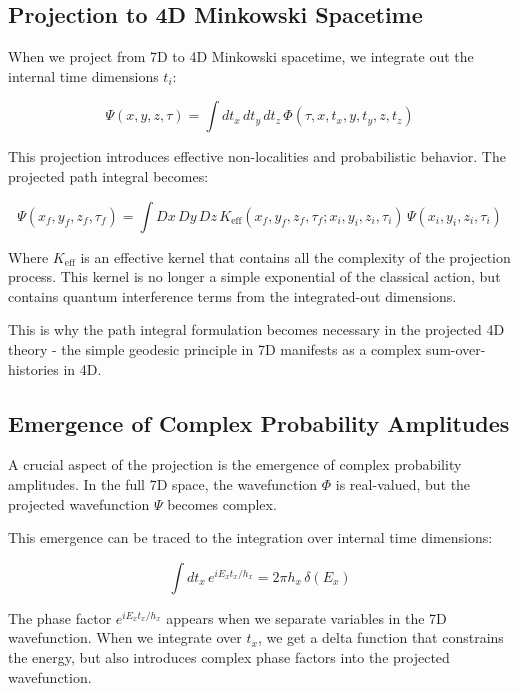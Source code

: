 \documentclass{article}
\begin{document}
\subsection{Projection to 4D Minkowski Spacetime}

When we project from 7D to 4D Minkowski spacetime, we integrate out the internal time dimensions $t_i$:

\begin{equation}
\Psi(x,y,z,\tau) = \int dt_x \, dt_y \, dt_z \, \Phi(\tau, x, t_x, y, t_y, z, t_z)
\end{equation}

This projection introduces effective non-localities and probabilistic behavior. The projected path integral becomes:

\begin{equation}
\Psi(x_f,y_f,z_f,\tau_f) = \int Dx \, Dy \, Dz \, K_{\text{eff}}(x_f,y_f,z_f,\tau_f;x_i,y_i,z_i,\tau_i) \, \Psi(x_i,y_i,z_i,\tau_i)
\end{equation}

Where $K_{\text{eff}}$ is an effective kernel that contains all the complexity of the projection process. This kernel is no longer a simple exponential of the classical action, but contains quantum interference terms from the integrated-out dimensions.

This is why the path integral formulation becomes necessary in the projected 4D theory - the simple geodesic principle in 7D manifests as a complex sum-over-histories in 4D.

\subsection{Emergence of Complex Probability Amplitudes}

A crucial aspect of the projection is the emergence of complex probability amplitudes. In the full 7D space, the wavefunction $\Phi$ is real-valued, but the projected wavefunction $\Psi$ becomes complex.

This emergence can be traced to the integration over internal time dimensions:

\begin{equation}
\int dt_x \, e^{iE_x t_x/h_x} = 2\pi h_x \, \delta(E_x)
\end{equation}

The phase factor $e^{iE_x t_x/h_x}$ appears when we separate variables in the 7D wavefunction. When we integrate over $t_x$, we get a delta function that constrains the energy, but also introduces complex phase factors into the projected wavefunction.
\end{document}
